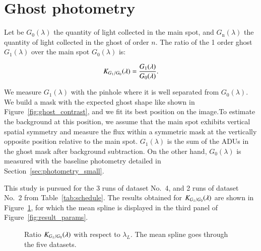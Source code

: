 \appendix

\section{Ghost photometry}
\label{sec:ghost_photometry}

Let be $G_0(\lambda)$ the quantity of light collected in the main spot, and $G_\mathrm{n}(\lambda)$ the quantity of light collected in the ghost of order $n$. The ratio of the 1 order ghost $G_1(\lambda)$ over the main spot $G_0(\lambda)$ is:

\begin{equation}
    K_{G_1/G_0}(\lambda) = \frac{G_1(\lambda)}{G_0(\lambda)}.
    \label{eq:ratio_ghost}
\end{equation}

We measure $G_1(\lambda)$ with the \spinhole pinhole where it is well separated from $G_0(\lambda)$. We build a mask with the expected ghost shape like shown in Figure~\ref{fig:ghost_contrast}, and we fit its best position on the image.To estimate the background at this position, we assume that the main spot exhibits vertical spatial symmetry and measure the flux within a symmetric mask at the vertically opposite position relative to the main spot. $G_1(\lambda)$ is the sum of the ADUs in the ghost mask after background subtraction. On the other hand, $G_0(\lambda)$ is measured with the baseline photometry detailed in Section~\ref{sec:photometry_small}. 

This study is pursued for the 3 runs of dataset No.~4, and 2 runs of dataset No.~2 from Table~\ref{tab:schedule}. The results obtained for $K_{G_1/G_0}(\lambda)$ are shown in Figure~\ref{fig:ghost_ratio}, for which the mean spline is displayed in the third panel of Figure~\ref{fig:result_params}.

\begin{figure}[h]
     \centering
     \caption{Ratio $K_{G_1/G_0}(\lambda)$ with respect to $\lambda_L$. The mean spline goes through the five datasets.}
     \label{fig:ghost_ratio}
\end{figure}

